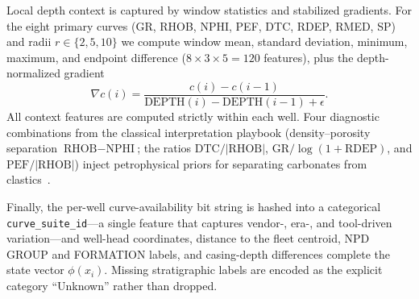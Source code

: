 \documentclass[bdcc,article,submit,pdftex,moreauthors]{Definitions/mdpi}
\begin{document}
Local depth context is captured by window statistics and stabilized gradients. For the eight
primary curves (GR, RHOB, NPHI, PEF, DTC, RDEP, RMED, SP) and radii $r\in\{2,5,10\}$ we
compute window mean, standard deviation, minimum, maximum, and endpoint difference
($8\!\times\!3\!\times\!5=120$ features), plus the depth-normalized gradient
\begin{equation}
\nabla c(i) = \frac{c(i)-c(i-1)}{\text{DEPTH}(i)-\text{DEPTH}(i-1)+\epsilon}.
\label{eq:grad}
\end{equation}
All context features are computed strictly within each well. Four diagnostic combinations
from the classical interpretation playbook (density--porosity separation $\text{RHOB}-\text{NPHI}$;
the ratios $\text{DTC}/|\text{RHOB}|$, $\text{GR}/\log(1+\text{RDEP})$, and
$\text{PEF}/|\text{RHOB}|$) inject petrophysical priors for separating carbonates from
clastics~\cite{rider2011,doveton2014}.

Finally, the per-well curve-availability bit string is hashed into a categorical
\texttt{curve\_suite\_id}---a single feature that captures vendor-, era-, and tool-driven
variation---and well-head coordinates, distance to the fleet centroid, NPD GROUP and
FORMATION labels, and casing-depth differences complete the state vector $\phi(x_i)$. Missing
stratigraphic labels are encoded as the explicit category ``Unknown'' rather than dropped.
\end{document}
